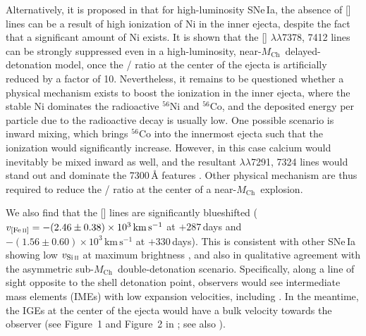 \documentclass[twocolumn]{aastex631}
\newcommand{\Mch}{$M_\mathrm{Ch}$}
\begin{document}
\begin{CJK*}{UTF8}{gbsn}
Alternatively, it is proposed in \citet{Blondin_2022} that for high-luminosity SNe\,Ia, the absence of [] lines can be a result of high ionization of Ni in the inner ejecta, despite the fact that a significant amount of Ni exists. It is shown that the [] $\lambda\lambda$7378, 7412 lines can be strongly suppressed even in a high-luminosity, near-\Mch\ delayed-detonation model, once the / ratio at the center of the ejecta is artificially reduced by a factor of 10. Nevertheless, it remains to be questioned whether a physical mechanism exists to boost the ionization in the inner ejecta, where the stable Ni dominates the radioactive $^{56}$Ni and $^{56}$Co, and the deposited energy per particle due to the radioactive decay is usually low. One possible scenario is inward mixing, which brings $^{56}$Co into the innermost ejecta such that the ionization would significantly increase. However, in this case calcium would inevitably be mixed inward as well, and the resultant  $\lambda\lambda$7291, 7324 lines would stand out and dominate the 7300\,\r{A} features \citep{Blondin_2022}. Other physical mechanism are thus required to reduce the / ratio at the center of a near-\Mch\ explosion.

We also find that the [] lines are significantly blueshifted ($v_\mathrm{[Fe\,\textsc{ii}]}=-(2.46\pm0.38)\times10^3\mathrm{\,km\,s^{-1}}$ at $+287$\,days and $-(1.56\pm0.60)\times10^3\mathrm{\,km\,s^{-1}}$ at $+330$\,days). This is consistent with other SNe\,Ia showing low $v_\mathrm{Si\,\textsc{ii}}$ at maximum brightness \citep{Maeda_2010,Maguire_2018,Li_2021}, and also in qualitative agreement with the asymmetric sub-\Mch\ double-detonation scenario. Specifically, along a line of sight opposite to the shell detonation point, observers would see intermediate mass elements (IMEs) with low expansion velocities, including . In the meantime, the IGEs at the center of the ejecta would have a bulk velocity towards the observer (see Figure~1 and Figure~2 in \citealp{Bulla_2016}; see also \citealp{Fink_DD_2010}).




\end{CJK*}
\end{document}
